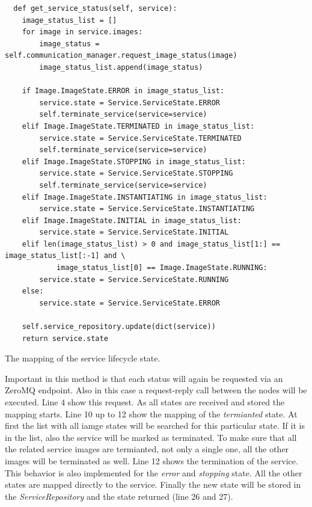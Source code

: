 \begin{listing}[H]
  \begin{verbatim}
  def get_service_status(self, service):
    image_status_list = []
    for image in service.images:
        image_status = self.communication_manager.request_image_status(image)
        image_status_list.append(image_status)

    if Image.ImageState.ERROR in image_status_list:
        service.state = Service.ServiceState.ERROR
        self.terminate_service(service=service)
    elif Image.ImageState.TERMINATED in image_status_list:
        service.state = Service.ServiceState.TERMINATED
        self.terminate_service(service=service)
    elif Image.ImageState.STOPPING in image_status_list:
        service.state = Service.ServiceState.STOPPING
        self.terminate_service(service=service)
    elif Image.ImageState.INSTANTIATING in image_status_list:
        service.state = Service.ServiceState.INSTANTIATING
    elif Image.ImageState.INITIAL in image_status_list:
        service.state = Service.ServiceState.INITIAL
    elif len(image_status_list) > 0 and image_status_list[1:] == image_status_list[:-1] and \
            image_status_list[0] == Image.ImageState.RUNNING:
        service.state = Service.ServiceState.RUNNING
    else:
        service.state = Service.ServiceState.ERROR

    self.service_repository.update(dict(service))
    return service.state
  \end{verbatim}
  \caption{The mapping of the service lifecycle state.}
  \label{code:service-state-lifecycle}
\end{listing}

Important in this method is that each status will again be requested via an ZeroMQ endpoint.
Also in this case a request-reply call between the nodes will be executed.
Line 4 show this request.
As all states are received and stored the mapping starts.
Line 10 up to 12 show the mapping of the \textit{termianted} state.
At first the list with all iamge states will be searched for this particular state.
If it is in the list, also the service will be marked as terminated.
To make sure that all the related service images are termianted, not only a single one, all the other images will be terminated as well.
Line 12 shows the termination of the service.
This behavior is also implemented for the \textit{error} and \textit{stopping} state.
All the other states are mapped directly to the service.
Finally the new state will be stored in the \textit{ServiceRepository} and the state returned (line 26 and 27).

